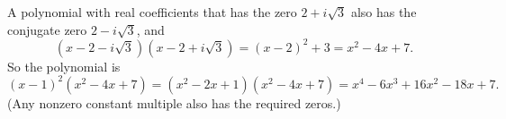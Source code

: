 A polynomial with real coefficients that has the zero $2+i\sqrt3$ also has the conjugate zero $2-i\sqrt3$, and
\[\left(x-2-i\sqrt3\right)\left(x-2+i\sqrt3\right)=(x-2)^2+3=x^2-4x+7.\]
So the polynomial is
\[(x-1)^2(x^2-4x+7)=(x^2-2x+1)(x^2-4x+7)=\boxed{x^4-6x^3+16x^2-18x+7}.\]
(Any nonzero constant multiple also has the required zeros.)
